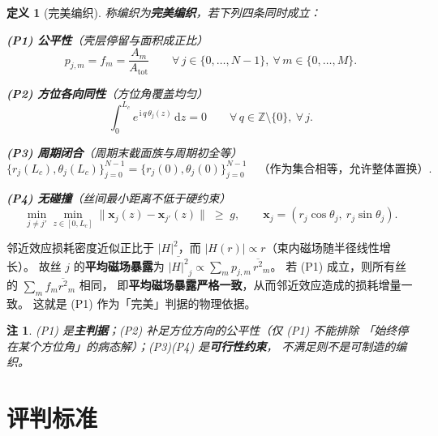 \documentclass[12pt, a4paper]{ctexart}
\newtheorem{definition}{定义}[section]
\newtheorem{remark}{注}[section]
\begin{document}
\begin{definition}[完美编织]
\label{def:perfect}
称编织为\textbf{完美编织}，若下列四条同时成立：

\vspace{2pt}
\textbf{(P1) 公平性}（壳层停留与面积成正比）
\begin{equation}
p_{j,m} = f_m = \frac{A_m}{A_{\mathrm{tot}}}
\qquad \forall\, j\in\{0,\dots,N-1\},\ \forall\, m\in\{0,\dots,M\}.
\label{eq:P1}
\end{equation}

\textbf{(P2) 方位各向同性}（方位角覆盖均匀）
\begin{equation}
\int_0^{L_c} e^{\,\mathrm{i}\,q\,\theta_j(z)}\,\mathrm{d}z = 0
\qquad \forall\, q \in \mathbb{Z}\setminus\{0\},\ \forall\, j .
\label{eq:P2}
\end{equation}

\textbf{(P3) 周期闭合}（周期末截面族与周期初全等）
\begin{equation}
\{r_j(L_c),\theta_j(L_c)\}_{j=0}^{N-1}
= \{r_j(0),\theta_j(0)\}_{j=0}^{N-1}
\quad\text{（作为集合相等，允许整体置换）}.
\label{eq:P3}
\end{equation}

\textbf{(P4) 无碰撞}（丝间最小距离不低于硬约束）
\begin{equation}
\min_{j\ne j'}\min_{z\in[0,L_c]}
\big\|\bm{x}_j(z)-\bm{x}_{j'}(z)\big\| \;\ge\; g,
\qquad \bm{x}_j = (r_j\cos\theta_j,\ r_j\sin\theta_j).
\label{eq:P4}
\end{equation}
\end{definition}

\begin{keybox}
邻近效应损耗密度近似正比于 $|H|^2$，而 $|H(r)|\propto r$（束内磁场随半径线性增长）。
故丝 $j$ 的\textbf{平均磁场暴露}为
$\overline{|H|^2}_j \propto \sum_m p_{j,m}\,\overline{r^2}_m$。
若 (P1) 成立，则所有丝的 $\sum_m f_m \overline{r^2}_m$ 相同，
即\textbf{平均磁场暴露严格一致}，从而邻近效应造成的损耗增量一致。
这就是 (P1) 作为「完美」判据的物理依据。
\end{keybox}

\begin{remark}
(P1) 是\textbf{主判据}；(P2) 补足方位方向的公平性（仅 (P1) 不能排除
「始终停在某个方位角」的病态解）；(P3)(P4) 是\textbf{可行性约束}，
不满足则不是可制造的编织。
\end{remark}

\section{评判标准}
\end{document}
